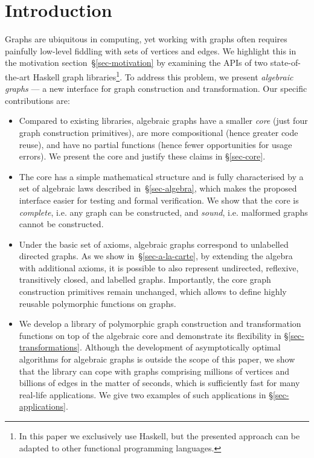 \documentclass[acmlarge,anonymous]{acmart}\settopmatter{printfolios=true}
\begin{document}
\section{Introduction}

Graphs are ubiquitous in computing, yet working with graphs often requires
painfully low-level fiddling with sets of vertices and edges. We highlight this
in the motivation section~\S\ref{sec-motivation} by examining the APIs of
two state-of-the-art Haskell graph libraries\footnote{In this paper we exclusively
use Haskell, but the presented approach can be adapted to other functional
programming languages.}. To address this problem, we present
\emph{algebraic graphs} --- a new interface for graph construction and
transformation. Our specific contributions are:

\begin{itemize}
  \item Compared to existing libraries, algebraic graphs have a smaller
  \emph{core} (just four graph construction primitives), are more compositional
  (hence greater code reuse), and have no partial functions (hence fewer
  opportunities for usage errors). We present the core and justify these claims
  in \S\ref{sec-core}.

  \item The core has a simple mathematical structure and is fully characterised
  by a set of algebraic laws described in~\S\ref{sec-algebra}, which makes the
  proposed interface easier for testing and formal verification. We show that
  the core is \emph{complete}, i.e. any graph can be constructed, and \emph{sound},
  i.e. malformed graphs cannot be constructed.

  \item Under the basic set of axioms, algebraic graphs correspond to unlabelled
  directed graphs. As we show in~\S\ref{sec-a-la-carte}, by extending the algebra
  with additional axioms, it is possible to also represent undirected, reflexive,
  transitively closed, and labelled graphs. Importantly, the core graph
  construction primitives remain unchanged, which allows to define highly
  reusable polymorphic functions on graphs.

  \item We develop a library of polymorphic graph construction and
  transformation functions on top of the algebraic core and demonstrate its
  flexibility in \S\ref{sec-transformations}.
  Although the development of asymptotically optimal algorithms for algebraic
  graphs is outside the scope of this paper, we show that the library can cope
  with graphs comprising millions of vertices and billions of edges in the
  matter of seconds, which is sufficiently fast for many real-life applications.
  We give two examples of such applications in \S\ref{sec-applications}.
\end{itemize}
\end{document}
